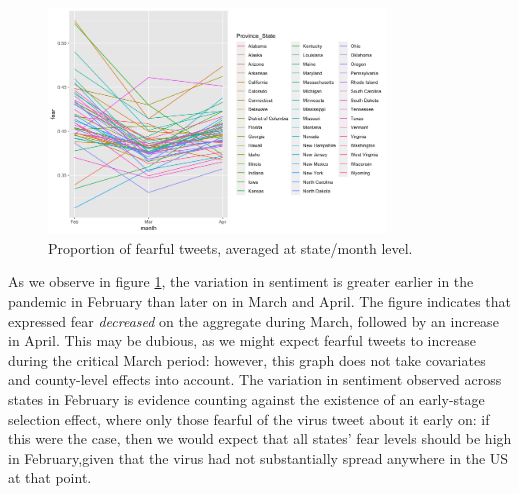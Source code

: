 \documentclass[12pt,a4]{article}
\begin{document}
\begin{figure}[h!]
  \includegraphics[width=0.8\textwidth]{figs/sent_time.png}    
  \centering
  \caption{Proportion of fearful tweets, averaged at state/month level.}
  \label{sent_time}
\end{figure}


As we observe in figure \ref{sent_time}, the variation in sentiment is greater earlier in the pandemic in February than later on in March and April.  The figure indicates that expressed fear \textit{decreased} on the aggregate during March, followed by an increase in April. This may be dubious, as we might expect fearful tweets to increase during the critical March period: however, this graph does not take covariates and county-level effects into account. The variation in sentiment observed across states in February is evidence counting against the existence of an early-stage selection effect, where only those fearful of the virus tweet about it early on: if this were the case, then we would expect that all states' fear levels should be high in February,given that the virus had not substantially spread anywhere in the US at that point.
\end{document}
